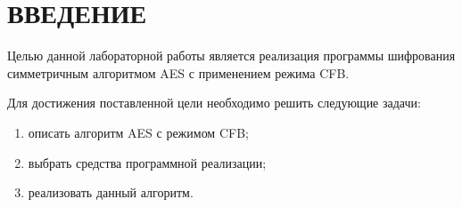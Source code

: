 \chapter*{ВВЕДЕНИЕ}

Целью данной лабораторной работы является реализация программы шифрования симметричным алгоритмом AES с применением режима CFB.

Для достижения поставленной цели необходимо решить следующие задачи:

\begin{enumerate}[label={\arabic*)}]
	\item описать алгоритм AES с режимом CFB;
	\item выбрать средства программной реализации;
	\item реализовать данный алгоритм.
\end{enumerate}